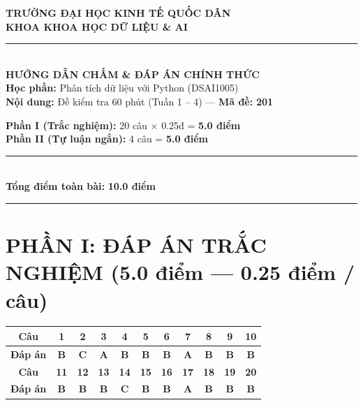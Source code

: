 \documentclass[11pt,a4paper]{article}
\begin{document}
\noindent
\begin{minipage}[t]{0.55\textwidth}
  \centering
  \textbf{TRƯỜNG ĐẠI HỌC KINH TẾ QUỐC DÂN}\\
  \textbf{KHOA KHOA HỌC DỮ LIỆU \& AI}\\
  \rule{4cm}{0.4pt}\\[2mm]
  \textbf{HƯỚNG DẪN CHẤM \& ĐÁP ÁN CHÍNH THỨC}\\
  \textbf{Học phần:} Phân tích dữ liệu với Python (DSAI1005)\\
  \textbf{Nội dung:} Đề kiểm tra 60 phút (Tuần 1 -- 4) --- \textbf{Mã đề:} \textbf{201}
\end{minipage}
\hfill
\begin{minipage}[t]{0.42\textwidth}
  \begin{tcolorbox}[colback=blue!5!white,colframe=blue!75!black,title=\textbf{Tổng quan thang điểm 10}]
    \small
    \textbf{Phần I (Trắc nghiệm):} 20 câu $\times$ 0.25đ = \textbf{5.0 điểm}\\
    \textbf{Phần II (Tự luận ngắn):} 4 câu = \textbf{5.0 điểm}\\
    \rule{\linewidth}{0.3pt}\\
    \textbf{Tổng điểm toàn bài:} \textbf{10.0 điểm}
  \end{tcolorbox}
\end{minipage}

\vspace{3mm}
\hrule
\vspace{2mm}

\section*{PHẦN I: ĐÁP ÁN TRẮC NGHIỆM (5.0 điểm --- 0.25 điểm / câu)}

\begin{center}
\begin{tabular}{|c|c|c|c|c|c|c|c|c|c|c|}
  \hline
  \textbf{Câu} & \textbf{1} & \textbf{2} & \textbf{3} & \textbf{4} & \textbf{5} & \textbf{6} & \textbf{7} & \textbf{8} & \textbf{9} & \textbf{10} \\
  \hline
  \textbf{Đáp án} & \textbf{B} & \textbf{C} & \textbf{A} & \textbf{B} & \textbf{B} & \textbf{B} & \textbf{A} & \textbf{B} & \textbf{B} & \textbf{B} \\
  \hline
  \hline
  \textbf{Câu} & \textbf{11} & \textbf{12} & \textbf{13} & \textbf{14} & \textbf{15} & \textbf{16} & \textbf{17} & \textbf{18} & \textbf{19} & \textbf{20} \\
  \hline
  \textbf{Đáp án} & \textbf{B} & \textbf{B} & \textbf{B} & \textbf{C} & \textbf{B} & \textbf{B} & \textbf{A} & \textbf{B} & \textbf{B} & \textbf{B} \\
  \hline
\end{tabular}
\end{center}
\end{document}

